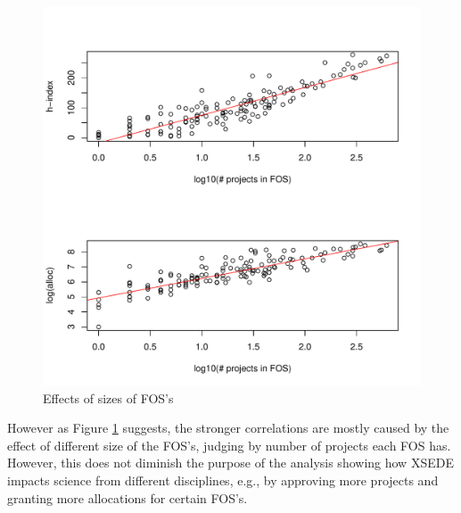 \documentclass{sig-alternate}
\begin{document}
\begin{figure}[!htb] 
  \centering 
    \includegraphics[width=1.0\columnwidth]{images/05_hindexalloc_vs_nprojects_fos_trended.pdf} 
  \caption{Effects of sizes of FOS's}\label{F:hindexalloc-vs-nprojects-fos-trended} 
\end{figure} 
 
However as Figure \ref{F:hindexalloc-vs-nprojects-fos-trended} suggests, the stronger correlations are mostly caused by the effect of different size of the FOS's, judging by number of projects each FOS has. However, this does not diminish the purpose of the analysis showing how XSEDE impacts science from different disciplines, e.g., by approving more projects and granting more allocations for certain FOS's. 
 
\end{document}
